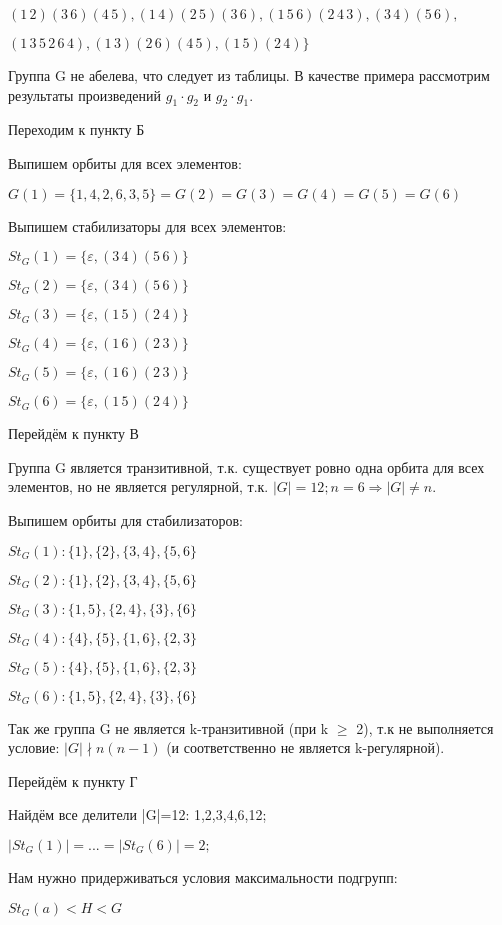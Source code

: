 \documentclass[utf8,14pt,a4paper,oneside,russian]{book}
\begin{document}
	$(1\,2)(3\,6)(4\,5),(1\,4)(2\,5)(3\,6),(1\,5\,6)(2\,4\,3),(3\,4)(5\,6),$
	
	$(1\,3\,5\,2\,6\,4),(1\,3)(2\,6)(4\,5),(1\,5)(2\,4)\}$
	
	Группа G не абелева, что следует из таблицы. В качестве примера рассмотрим результаты произведений $g_{1}\cdot g_{2}$ и $g_{2}\cdot g_{1}$.
	
	Переходим к пункту Б
	
	Выпишем орбиты для всех элементов:
	
	$G(1)=\{1,4,2,6,3,5\}=G(2)=G(3)=G(4)=G(5)=G(6)$
	
	Выпишем стабилизаторы для всех элементов:
	
	$St_{G}(1)=\{\varepsilon,(3\,4)(5\,6)\}$
	
	$St_{G}(2)=\{\varepsilon,(3\,4)(5\,6)\}$
	
	$St_{G}(3)=\{\varepsilon,(1\,5)(2\,4)\}$
	
	$St_{G}(4)=\{\varepsilon,(1\,6)(2\,3)\}$
	
	$St_{G}(5)=\{\varepsilon,(1\,6)(2\,3)\}$
	
	$St_{G}(6)=\{\varepsilon,(1\,5)(2\,4)\}$
	
	Перейдём к пункту В
	
	Группа G является транзитивной, т.к. существует ровно одна орбита для всех элементов, но не является регулярной, т.к. $|G|=12; n=6 \Rightarrow |G|\neq n$.
	
	Выпишем орбиты для стабилизаторов:
	
	$St_{G}(1):\{1\},\{2\},\{3,4\},\{5,6\}$
	
	$St_{G}(2):\{1\},\{2\},\{3,4\},\{5,6\}$
	
	$St_{G}(3):\{1,5\},\{2,4\},\{3\},\{6\}$
	
	$St_{G}(4):\{4\},\{5\},\{1,6\},\{2,3\}$
	
	$St_{G}(5):\{4\},\{5\},\{1,6\},\{2,3\}$
	
	$St_{G}(6):\{1,5\},\{2,4\},\{3\},\{6\}$
	
	Так же группа G не является k-транзитивной (при k $\geq$ 2), т.к не выполняется условие: $|G|\nmid n(n-1)$ (и соответственно не является k-регулярной).
	
	Перейдём к пункту Г
	
	Найдём все делители |G|=12: 1,2,3,4,6,12;
	
	$|St_{G}(1)|=...=|St_{G}(6)|=2;$
	
	Нам нужно придерживаться условия максимальности подгрупп:
	
	$St_{G}(a)<H<G$
	
\end{document}
